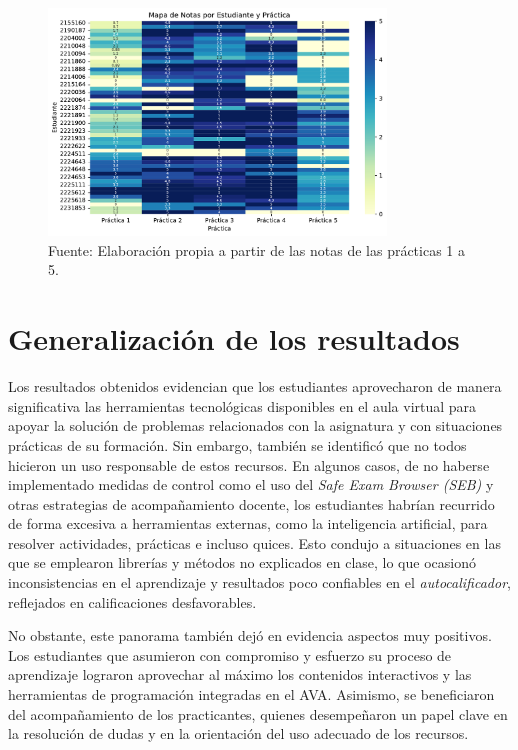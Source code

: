 \documentclass[letter,oneside,12pt,spanish]{report}
\begin{document}
\begin{figure}[ht]
	\centering
	\includegraphics[width=0.8\textwidth]{Figs/Mapa_Notas.pdf}
	\label{fig:Mapa}
	\\Fuente: Elaboración propia a partir de las notas de las prácticas 1 a 5.
\end{figure}

\section{Generalización de los resultados}

Los resultados obtenidos evidencian que los estudiantes aprovecharon de manera significativa las herramientas tecnológicas disponibles en el aula virtual para apoyar la solución de problemas relacionados con la asignatura y con situaciones prácticas de su formación. Sin embargo, también se identificó que no todos hicieron un uso responsable de estos recursos. En algunos casos, de no haberse implementado medidas de control como el uso del \textit{Safe Exam Browser (SEB)} y otras estrategias de acompañamiento docente, los estudiantes habrían recurrido de forma excesiva a herramientas externas, como la inteligencia artificial, para resolver actividades, prácticas e incluso quices. Esto condujo a situaciones en las que se emplearon librerías y métodos no explicados en clase, lo que ocasionó inconsistencias en el aprendizaje y resultados poco confiables en el \textit{autocalificador}, reflejados en calificaciones desfavorables.

No obstante, este panorama también dejó en evidencia aspectos muy positivos. Los estudiantes que asumieron con compromiso y esfuerzo su proceso de aprendizaje lograron aprovechar al máximo los contenidos interactivos y las herramientas de programación integradas en el AVA. Asimismo, se beneficiaron del acompañamiento de los practicantes, quienes desempeñaron un papel clave en la resolución de dudas y en la orientación del uso adecuado de los recursos.
\end{document}
